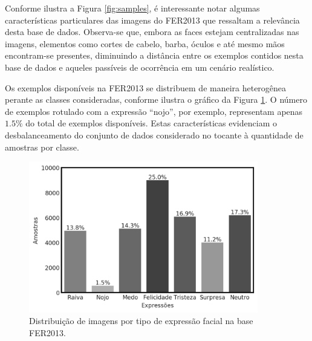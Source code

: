 Conforme ilustra a Figura \ref{fig:samples}, é interessante notar algumas características particulares das imagens do FER2013 que ressaltam a relevância desta base de dados. Observa-se que, embora as faces estejam centralizadas nas imagens, elementos como cortes de cabelo, barba, óculos e até mesmo mãos encontram-se presentes, diminuindo a distância entre os exemplos contidos nesta base de dados e aqueles passíveis de ocorrência em um cenário realístico.

Os exemplos disponíveis na FER2013 se distribuem de maneira heterogênea perante as classes consideradas, conforme ilustra o gráfico da Figura \ref{fig:dataset}. O número de exemplos rotulado com a expressão ``nojo'', por exemplo, representam apenas $1.5\%$ do total de exemplos disponíveis. Estas características evidenciam o desbalanceamento do conjunto de dados considerado no tocante à quantidade de amostras por classe.

\begin{figure}[!htb]
    \centering
    \caption{Distribuição de imagens por tipo de expressão facial na base FER2013.}  \label{fig:dataset}
    \includegraphics[width=10cm]{images/expression_distribution.png}
\end{figure}
